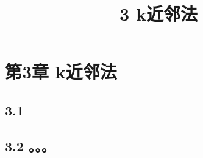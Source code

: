 \documentclass{article}
\begin{document}
\title{3 k近邻法}
\date{}
\maketitle
\else
\chapter*{第3章 k近邻法}
\fi
\section*{3.1 }

\section*{3.2 。。。}
\ifx\allfiles\undefined
\end{document}
